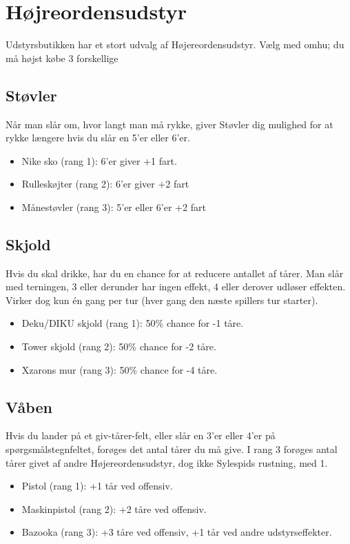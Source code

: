 \documentclass{article}
\begin{document}
\section{Højreordensudstyr}
Udstyrsbutikken har et stort udvalg af Højereordensudstyr. Vælg med omhu; du må højst købe 3  forskellige
 
\subsection{Støvler}
Når man slår om, hvor langt man må rykke, giver Støvler dig mulighed for at rykke længere hvis du slår en 5’er eller 6’er.

\begin{itemize}
	\item Nike sko (rang 1): 6'er giver +1 fart.
	\item Rulleskøjter (rang 2): 6'er giver +2 fart
	\item Månestøvler (rang 3): 5'er eller 6'er +2 fart
\end{itemize}
 
\subsection{Skjold}
Hvis du skal drikke, har du en chance for at reducere antallet af tårer. Man slår med terningen, 3 eller derunder har ingen effekt, 4 eller derover udløser effekten. Virker dog kun én gang per tur (hver gang den næste spillers tur starter).

\begin{itemize}
	\item Deku/DIKU skjold (rang 1): 50\% chance for -1 tåre.
	\item Tower skjold (rang 2): 50\% chance for -2 tåre.
	\item Xzarons mur (rang 3): 50\% chance for -4 tåre.
\end{itemize}
 
\subsection{Våben} Hvis du lander på et giv-tårer-felt, eller slår en 3’er eller 4’er på spørgsmålstegnfeltet, forøges det antal tårer du må give. I rang 3 forøges antal tårer givet af andre Højereordensudstyr, dog ikke Sylespids rustning, med 1.

\begin{itemize}
	\item Pistol (rang 1): +1 tår ved offensiv.
	\item Maskinpistol (rang 2): +2 tåre ved offensiv.
	\item Bazooka (rang 3): +3 tåre ved offensiv, +1 tår ved andre udstyrseffekter.
\end{itemize}
 
\end{document}
